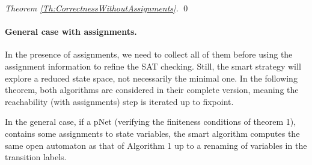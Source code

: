 \documentclass[smallcondensed]{svjour3}
\begin{document}
\begin{proof}[Theorem \ref{Th:CorrectnessWithoutAssignments}]
%	
%
%
\hfill\qed
\end{proof}

\paragraph{General case with assignments.}
In the presence of assignments, we need to collect all of them
  before using the assignment information to refine the SAT
  checking. Still, the smart strategy will explore a reduced state
  space, not necessarily the minimal one. In the
  following theorem, both algorithms are considered in their complete
  version, meaning the reachability (with assignments) step is
  iterated up to fixpoint.
  
\begin{theorem}
  \label{Th:CorrectnessWithAssignments}
In the general case, if a pNet (verifying the finiteness conditions of theorem 1), contains some assignments to state variables, the smart algorithm computes 
the same open automaton as that of Algorithm 1 up to a renaming of variables in the transition labels.
\end{theorem}
\end{document}

